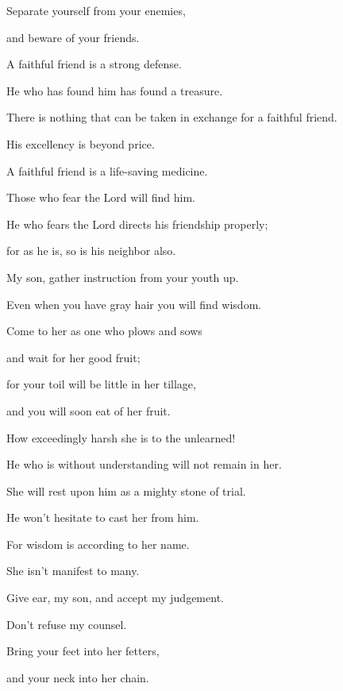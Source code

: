 {\par }{\Q {}Separate yourself from your enemies,
\par }{\QB and beware of your friends.
\par }{\BB \par }{\Q {}A faithful friend is a strong defense.
\par }{\QB He who has found him has found a treasure.
\par }{\Q {}There is nothing that can be taken in exchange for a faithful friend.
\par }{\QB His excellency is beyond price.
\par }{\Q {}A faithful friend is a life-saving medicine.
\par }{\QB Those who fear the Lord will find him.
\par }{\Q {}He who fears the Lord directs his friendship properly;
\par }{\QB for as he is, so is his neighbor also.
\par }{\BB \par }{\Q {}My son, gather instruction from your youth up.
\par }{\QB Even when you have gray hair you will find wisdom.
\par }{\Q {}Come to her as one who plows and sows
\par }{\QB and wait for her good fruit;
\par }{\Q for your toil will be little in her tillage,
\par }{\QB and you will soon eat of her fruit.
\par }{\Q {}How exceedingly harsh she is to the unlearned!
\par }{\QB He who is without understanding will not remain in her.
\par }{\Q {}She will rest upon him as a mighty stone of trial.
\par }{\QB He won’t hesitate to cast her from him.
\par }{\Q {}For wisdom is according to her name.
\par }{\Q She isn’t manifest to many.
\par }{\BB \par }{\Q {}Give ear, my son, and accept my judgement.
\par }{\QB Don’t refuse my counsel.
\par }{\Q {}Bring your feet into her fetters,
\par }{\QB and your neck into her chain.
}
